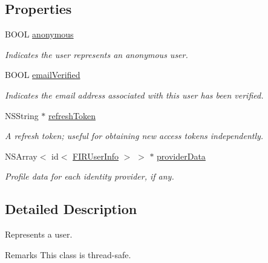 \subsection*{Properties}
\begin{DoxyCompactItemize}
\item 
\hypertarget{interface_f_i_r_user_ad8c9b848ff3a3a5ef602d48879197363}{}B\+O\+O\+L \hyperlink{interface_f_i_r_user_ad8c9b848ff3a3a5ef602d48879197363}{anonymous}\label{interface_f_i_r_user_ad8c9b848ff3a3a5ef602d48879197363}

\begin{DoxyCompactList}\small\item\em Indicates the user represents an anonymous user. \end{DoxyCompactList}\item 
\hypertarget{interface_f_i_r_user_a5e8d5dcca548df938a4623f195f4ee24}{}B\+O\+O\+L \hyperlink{interface_f_i_r_user_a5e8d5dcca548df938a4623f195f4ee24}{email\+Verified}\label{interface_f_i_r_user_a5e8d5dcca548df938a4623f195f4ee24}

\begin{DoxyCompactList}\small\item\em Indicates the email address associated with this user has been verified. \end{DoxyCompactList}\item 
N\+S\+String $\ast$ \hyperlink{interface_f_i_r_user_a7773545eef6e78ee94d863301c55a4d5}{refresh\+Token}
\begin{DoxyCompactList}\small\item\em A refresh token; useful for obtaining new access tokens independently. \end{DoxyCompactList}\item 
N\+S\+Array$<$ id$<$ \hyperlink{protocol_f_i_r_user_info-p}{F\+I\+R\+User\+Info} $>$ $>$ $\ast$ \hyperlink{interface_f_i_r_user_abe650825963214d5f24891f7cbe0e395}{provider\+Data}
\begin{DoxyCompactList}\small\item\em Profile data for each identity provider, if any. \end{DoxyCompactList}\end{DoxyCompactItemize}


\subsection{Detailed Description}
Represents a user. 

\begin{DoxyRemark}{Remarks}
This class is thread-\/safe. 
\end{DoxyRemark}


